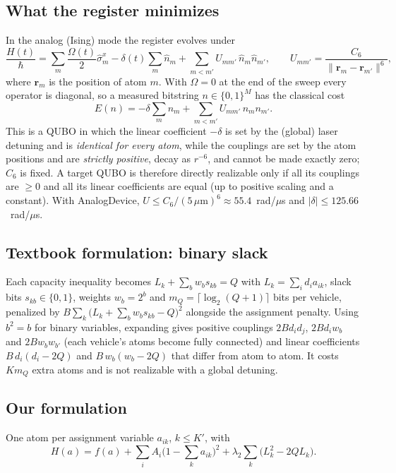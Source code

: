 \documentclass[10pt]{article}
\begin{document}
\subsection{What the register minimizes}
In the analog (Ising) mode the register evolves under
\begin{equation}
  \frac{H(t)}{\hbar}=\sum_m \frac{\Omega(t)}{2}\hat\sigma^x_m-\delta(t)\sum_m \hat n_m
  +\sum_{m<m'}U_{mm'}\,\hat n_m\hat n_{m'},\qquad U_{mm'}=\frac{C_6}{\lVert \mathbf r_m-\mathbf r_{m'}\rVert^6},
\end{equation}
where $\mathbf r_m$ is the position of atom $m$. With $\Omega=0$ at the end of the sweep every operator is
diagonal, so a measured bitstring $n\in\{0,1\}^M$ has the classical cost
\begin{equation}
  E(n)=-\delta\sum_m n_m+\sum_{m<m'}U_{mm'}\,n_m n_{m'} .
  \label{eq:register}
\end{equation}
This is a QUBO in which the linear coefficient $-\delta$ is set by the (global) laser detuning and is
\emph{identical for every atom}, while the couplings are set by the atom positions and are
\emph{strictly positive}, decay as $r^{-6}$, and cannot be made exactly zero; $C_6$ is fixed. A target
QUBO is therefore directly realizable only if all its couplings are $\ge 0$ and all its linear coefficients
are equal (up to positive scaling and a constant). With AnalogDevice, $U\le C_6/(5\,\mu\mathrm m)^6\approx 55.4$~rad/$\mu$s
and $|\delta|\le125.66$~rad/$\mu$s.

\subsection{Textbook formulation: binary slack}
Each capacity inequality becomes $L_k+\sum_{b} w_b s_{kb}=Q$ with $L_k=\sum_i d_i a_{ik}$, slack bits
$s_{kb}\in\{0,1\}$, weights $w_b=2^b$ and $m_Q=\lceil\log_2(Q+1)\rceil$ bits per vehicle, penalized by
$B\sum_k\big(L_k+\sum_b w_b s_{kb}-Q\big)^2$ alongside the assignment penalty. Using $b^2=b$ for binary variables, expanding gives
positive couplings $2Bd_id_j$, $2Bd_iw_b$ and $2Bw_bw_{b'}$ (each vehicle's atoms become fully connected)
and linear coefficients $B\,d_i(d_i-2Q)$ and $B\,w_b(w_b-2Q)$ that differ from atom to atom. It costs
$K m_Q$ extra atoms and is not realizable with a global detuning.

\subsection{Our formulation}
One atom per assignment variable $a_{ik}$, $k\le K'$, with
\begin{equation}
  H(a)=f(a)+\sum_i A_i\Big(1-\sum_{k}a_{ik}\Big)^2+\lambda_2\sum_{k}\big(L_k^2-2QL_k\big).
  \label{eq:qubo}
\end{equation}
\end{document}
